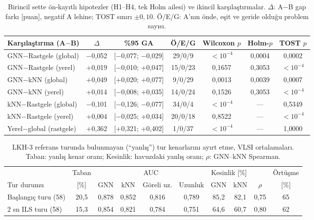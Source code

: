 \documentclass[pdflatex,sn-basic]{sn-jnl}
\begin{document}
\begin{table}[!htbp]
\centering\small\setlength{\tabcolsep}{3pt}
\caption{Birincil sette ön-kayıtlı hipotezler (H1--H4, tek Holm ailesi) ve ikincil karşılaştırmalar. $\Delta$: A$-$B gap farkı [puan], negatif A lehine; TOST sınırı $\pm0{,}10$. Ö/E/G: A'nın önde, eşit ve geride olduğu problem sayısı.}
\label{tab:v2-primary-tests}
\begin{tabular*}{\textwidth}{@{\extracolsep{\fill}}lcccccc}
\toprule
Karşılaştırma (A$-$B) & $\Delta$ & \%95 GA & Ö/E/G & Wilcoxon $p$ & Holm-$p$ & TOST $p$ \\
\midrule
GNN$-$Rastgele (global) & $-$0{,}052 & [$-$0{,}077; $-$0{,}029] & 29/0/9 & $<10^{-4}$ & 0{,}0004 & 0{,}0002 \\
GNN$-$Rastgele (yerel) & +0{,}019 & [$-$0{,}010; +0{,}047] & 15/0/23 & 0{,}1657 & 0{,}3053 & $<10^{-4}$ \\
GNN$-$kNN (global) & +0{,}049 & [+0{,}020; +0{,}077] & 9/0/29 & 0{,}0013 & 0{,}0039 & 0{,}0007 \\
GNN$-$kNN (yerel) & +0{,}014 & [$-$0{,}008; +0{,}035] & 14/0/24 & 0{,}1526 & 0{,}3053 & $<10^{-4}$ \\
\midrule
kNN$-$Rastgele (global) & $-$0{,}101 & [$-$0{,}126; $-$0{,}077] & 34/0/4 & $<10^{-4}$ & --- & 0{,}5349 \\
kNN$-$Rastgele (yerel) & +0{,}004 & [$-$0{,}025; +0{,}034] & 20/0/18 & 0{,}8522 & --- & $<10^{-4}$ \\
Yerel$-$global (rastgele) & +0{,}362 & [+0{,}321; +0{,}402] & 1/0/37 & $<10^{-4}$ & --- & 1{,}0000 \\
\bottomrule
\end{tabular*}
\end{table}
\begin{table}[!htbp]
\centering\small\setlength{\tabcolsep}{2.5pt}
\caption{LKH-3 referans turunda bulunmayan (``yanlış'') tur kenarlarını ayırt etme, VLSI ortalamaları. Taban: yanlış kenar oranı; Kesinlik: havuzdaki yanlış oranı; $\rho$: GNN--kNN Spearman.}
\label{tab:v2-mechanism}
\begin{tabular*}{\textwidth}{@{\extracolsep{\fill}}lccccccccc}
\toprule
 & Taban & \multicolumn{4}{c}{AUC} & \multicolumn{2}{c}{Kesinlik [\%]} & & Örtüşme \\
\cmidrule(lr){3-6}\cmidrule(lr){7-8}
Tur durumu & [\%] & GNN & kNN & Göreli uz. & Uzunluk & GNN & kNN & $\rho$ & [\%] \\
\midrule
Başlangıç turu (58) & 20{,}5 & 0{,}878 & 0{,}852 & 0{,}816 & 0{,}789 & 85{,}2 & 82{,}1 & 0{,}75 & 65 \\
2 sn ILS turu (58) & 15{,}3 & 0{,}854 & 0{,}821 & 0{,}784 & 0{,}751 & 64{,}6 & 60{,}7 & 0{,}80 & 62 \\
\bottomrule
\end{tabular*}
\end{table}
\end{document}
